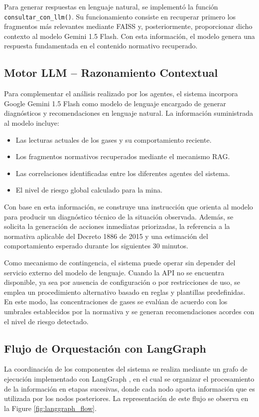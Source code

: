 \documentclass[journal,onecolumn]{IEEEtran}
\begin{document}
Para generar respuestas en lenguaje natural, se implementó la función \texttt{consultar\_con\_llm()}. Su funcionamiento consiste en recuperar primero los fragmentos más relevantes mediante FAISS y, posteriormente, proporcionar dicho contexto al modelo Gemini 1.5 Flash. Con esta información, el modelo genera una respuesta fundamentada en el contenido normativo recuperado.

\subsection{Motor LLM -- Razonamiento Contextual}

Para complementar el análisis realizado por los agentes, el sistema incorpora Google Gemini 1.5 Flash \cite{gemini} como modelo de lenguaje encargado de generar diagnósticos y recomendaciones en lenguaje natural. La información suministrada al modelo incluye:

\begin{itemize}
    \item Las lecturas actuales de los gases y su comportamiento reciente.
    \item Los fragmentos normativos recuperados mediante el mecanismo RAG.
    \item Las correlaciones identificadas entre los diferentes agentes del sistema.
    \item El nivel de riesgo global calculado para la mina.
\end{itemize}

Con base en esta información, se construye una instrucción que orienta al modelo para producir un diagnóstico técnico de la situación observada. Además, se solicita la generación de acciones inmediatas priorizadas, la referencia a la normativa aplicable del Decreto 1886 de 2015 y una estimación del comportamiento esperado durante los siguientes 30 minutos.

Como mecanismo de contingencia, el sistema puede operar sin depender del servicio externo del modelo de lenguaje. Cuando la API no se encuentra disponible, ya sea por ausencia de configuración o por restricciones de uso, se emplea un procedimiento alternativo basado en reglas y plantillas predefinidas. En este modo, las concentraciones de gases se evalúan de acuerdo con los umbrales establecidos por la normativa y se generan recomendaciones acordes con el nivel de riesgo detectado.

\subsection{Flujo de Orquestación con LangGraph}
La coordinación de los componentes del sistema se realiza mediante un grafo de ejecución implementado con LangGraph \cite{langgraph}, en el cual se organizar el procesamiento de la información en etapas sucesivas, donde cada nodo aporta información que es utilizada por los nodos posteriores. La representación de este flujo se observa en la Figure \ref{fig:langgraph_flow}.
\end{document}
